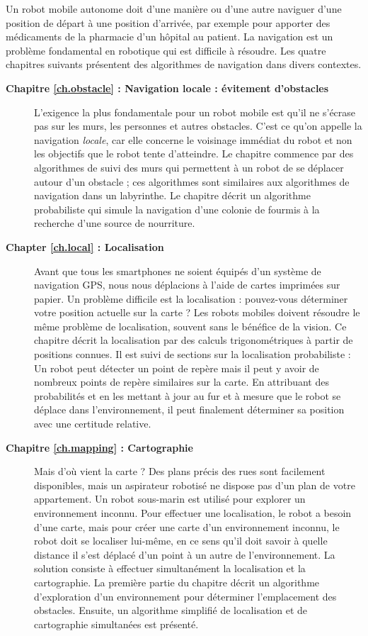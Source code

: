 Un robot mobile autonome doit d'une manière ou d'une autre naviguer d'une position de départ à une position d'arrivée, par exemple pour apporter des médicaments de la pharmacie d'un hôpital au patient. La navigation est un problème fondamental en robotique qui est difficile à résoudre. Les quatre chapitres suivants présentent des algorithmes de navigation dans divers contextes.
\begin{description}
\item [\textbf{Chapitre \ref{ch.obstacle} : Navigation locale : évitement d'obstacles}] L'exigence la plus fondamentale pour un robot mobile est qu'il ne s'écrase pas sur les murs, les personnes et autres obstacles. C'est ce qu'on appelle la navigation \emph{locale}, car elle concerne le voisinage immédiat du robot et non les objectifs que le robot tente d'atteindre. Le chapitre commence par des algorithmes de suivi des murs qui permettent à un robot de se déplacer autour d'un obstacle ; ces algorithmes sont similaires aux algorithmes de navigation dans un labyrinthe. Le chapitre décrit un algorithme probabiliste qui simule la navigation d'une colonie de fourmis à la recherche d'une source de nourriture.
\smallskip
\item [\textbf{Chapter \ref{ch.local} : Localisation}] Avant que tous les smartphones ne soient équipés d'un système de navigation GPS, nous nous déplacions à l'aide de cartes imprimées sur papier. Un problème difficile est la localisation : pouvez-vous déterminer votre position actuelle sur la carte ? Les robots mobiles doivent résoudre le même problème de localisation, souvent sans le bénéfice de la vision. Ce chapitre décrit la localisation par des calculs trigonométriques à partir de positions connues. Il est suivi de sections sur la localisation probabiliste : Un robot peut détecter un point de repère mais il peut y avoir de nombreux points de repère similaires sur la carte. En attribuant des probabilités et en les mettant à jour au fur et à mesure que le robot se déplace dans l'environnement, il peut finalement déterminer sa position avec une certitude relative.
\smallskip
\item [\textbf{Chapitre \ref{ch.mapping} : Cartographie}] Mais d'où vient la carte ? Des plans précis des rues sont facilement disponibles, mais un aspirateur robotisé ne dispose pas d'un plan de votre appartement. Un robot sous-marin est utilisé pour explorer un environnement inconnu. Pour effectuer une localisation, le robot a besoin d'une carte, mais pour créer une carte d'un environnement inconnu, le robot doit se localiser lui-même, en ce sens qu'il doit savoir à quelle distance il s'est déplacé d'un point à un autre de l'environnement. La solution consiste à effectuer simultanément la localisation et la cartographie. La première partie du chapitre décrit un algorithme d'exploration d'un environnement pour déterminer l'emplacement des obstacles. Ensuite, un algorithme simplifié de localisation et de cartographie simultanées est présenté.

\end{description}
